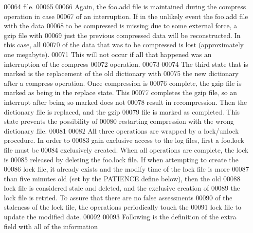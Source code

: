 \begin{DoxyCode}
00064 \textcolor{comment}{   file.}
00065 \textcolor{comment}{}
00066 \textcolor{comment}{   Again, the foo.add file is maintained during the compress operation in case}
00067 \textcolor{comment}{   of an interruption.  If in the unlikely event the foo.add file with the data}
00068 \textcolor{comment}{   to be compressed is missing due to some external force, a gzip file with}
00069 \textcolor{comment}{   just the previous compressed data will be reconstructed.  In this case, all}
00070 \textcolor{comment}{   of the data that was to be compressed is lost (approximately one megabyte).}
00071 \textcolor{comment}{   This will not occur if all that happened was an interruption of the compress}
00072 \textcolor{comment}{   operation.}
00073 \textcolor{comment}{}
00074 \textcolor{comment}{   The third state that is marked is the replacement of the old dictionary with}
00075 \textcolor{comment}{   the new dictionary after a compress operation.  Once compression is}
00076 \textcolor{comment}{   complete, the gzip file is marked as being in the replace state.  This}
00077 \textcolor{comment}{   completes the gzip file, so an interrupt after being so marked does not}
00078 \textcolor{comment}{   result in recompression.  Then the dictionary file is replaced, and the gzip}
00079 \textcolor{comment}{   file is marked as completed.  This state prevents the possibility of}
00080 \textcolor{comment}{   restarting compression with the wrong dictionary file.}
00081 \textcolor{comment}{}
00082 \textcolor{comment}{   All three operations are wrapped by a lock/unlock procedure.  In order to}
00083 \textcolor{comment}{   gain exclusive access to the log files, first a foo.lock file must be}
00084 \textcolor{comment}{   exclusively created.  When all operations are complete, the lock is}
00085 \textcolor{comment}{   released by deleting the foo.lock file.  If when attempting to create the}
00086 \textcolor{comment}{   lock file, it already exists and the modify time of the lock file is more}
00087 \textcolor{comment}{   than five minutes old (set by the PATIENCE define below), then the old}
00088 \textcolor{comment}{   lock file is considered stale and deleted, and the exclusive creation of}
00089 \textcolor{comment}{   the lock file is retried.  To assure that there are no false assessments}
00090 \textcolor{comment}{   of the staleness of the lock file, the operations periodically touch the}
00091 \textcolor{comment}{   lock file to update the modified date.}
00092 \textcolor{comment}{}
00093 \textcolor{comment}{   Following is the definition of the extra field with all of the information}

\end{DoxyCode}
